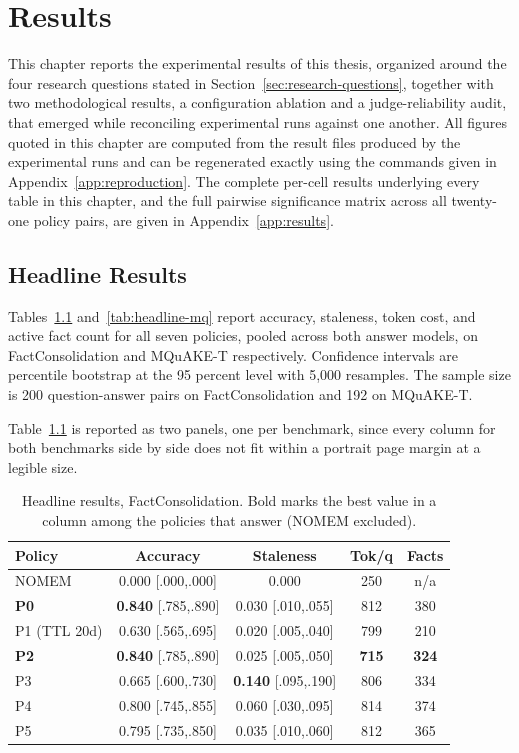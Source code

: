 \chapter{Results}
\label{chap:results}

This chapter reports the experimental results of this thesis, organized around the four research questions stated in Section~\ref{sec:research-questions}, together with two methodological results, a configuration ablation and a judge-reliability audit, that emerged while reconciling experimental runs against one another. All figures quoted in this chapter are computed from the result files produced by the experimental runs and can be regenerated exactly using the commands given in Appendix~\ref{app:reproduction}. The complete per-cell results underlying every table in this chapter, and the full pairwise significance matrix across all twenty-one policy pairs, are given in Appendix~\ref{app:results}.

\section{Headline Results}
\label{sec:headline}

Tables~\ref{tab:headline} and~\ref{tab:headline-mq} report accuracy, staleness, token cost, and active fact count for all seven policies, pooled across both answer models, on FactConsolidation and MQuAKE-T respectively. Confidence intervals are percentile bootstrap at the 95 percent level with 5,000 resamples. The sample size is 200 question-answer pairs on FactConsolidation and 192 on MQuAKE-T.

Table~\ref{tab:headline} is reported as two panels, one per benchmark, since every column for both benchmarks side by side does not fit within a portrait page margin at a legible size.

\begin{table}[H]
\centering
\caption{Headline results, FactConsolidation. Bold marks the best value in a column among the policies that answer (NOMEM excluded).}
\label{tab:headline}
\small
\begin{tabular}{lcccc}
\toprule
Policy & Accuracy & Staleness & Tok/q & Facts \\
\midrule
NOMEM & 0.000 [.000,.000] & 0.000 & 250 & n/a \\
\textbf{P0} & \textbf{0.840} [.785,.890] & 0.030 [.010,.055] & 812 & 380 \\
P1 (TTL 20d) & 0.630 [.565,.695] & 0.020 [.005,.040] & 799 & 210 \\
\textbf{P2} & \textbf{0.840} [.785,.890] & 0.025 [.005,.050] & \textbf{715} & \textbf{324} \\
P3 & 0.665 [.600,.730] & \textbf{0.140} [.095,.190] & 806 & 334 \\
P4 & 0.800 [.745,.855] & 0.060 [.030,.095] & 814 & 374 \\
P5 & 0.795 [.735,.850] & 0.035 [.010,.060] & 812 & 365 \\
\bottomrule
\end{tabular}
\end{table}

